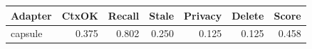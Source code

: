 \begin{tabular}{lrrrrrr}
\hline
Adapter & CtxOK & Recall & Stale & Privacy & Delete & Score \\
\hline
capsule & 0.375 & 0.802 & 0.250 & 0.125 & 0.125 & 0.458 \\
\hline
\end{tabular}
